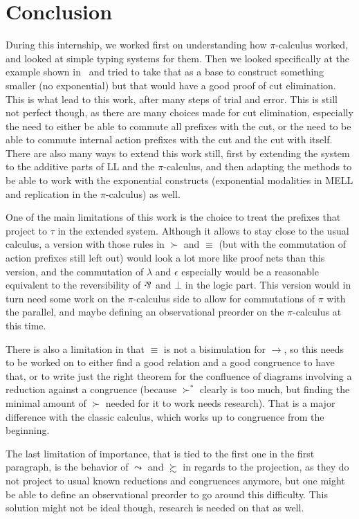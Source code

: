 \section*{Conclusion}

During this internship, we worked first on understanding how $\pi$-calculus worked, and looked at simple typing systems for them. Then we looked specifically at the example shown in~\cite{beffara-2015-unifying} and tried to take that as a base to construct something smaller (no exponential) but that would have a good proof of cut elimination. This is what lead to this work, after many steps of trial and error. This is still not perfect though, as there are many choices made for cut elimination, especially the need to either be able to commute all prefixes with the cut, or the need to be able to commute internal action prefixes with the cut and the cut with itself. There are also many ways to extend this work still, first by extending the system to the additive parts of LL and the $\pi$-calculus, and then adapting the methods to be able to work with the exponential constructs (exponential modalities in MELL and replication in the $\pi$-calculus) as well.

One of the main limitations of this work is the choice to treat the prefixes that project to $\tau$ in the extended system. Although it allows to stay close to the usual calculus, a version with those rules in $\succ$ and $\equiv$ (but with the commutation of action prefixes still left out) would look a lot more like proof nets than this version, and the commutation of $\lambda$ and $\epsilon$ especially would be a reasonable equivalent to the reversibility of $\logpar$ and $\bot$ in the logic part. This version would in turn need some work on the $\pi$-calculus side to allow for commutations of $\pi$ with the parallel, and maybe defining an observational preorder on the $\pi$-calculus at this time.

There is also a limitation in that $\equiv$ is not a bisimulation for $\to$, so this needs to be worked on to either find a good relation and a good congruence to have that, or to write just the right theorem for the confluence of diagrams involving a reduction against a congruence (because $\succ^*$ clearly is too much, but finding the minimal amount of $\succ$ needed for it to work needs research). That is a major difference with the classic calculus, which works up to congruence from the beginning.

The last limitation of importance, that is tied to the first one in the first paragraph, is the behavior of $\leadsto$ and $\succsim$ in regards to the projection, as they do not project to usual known reductions and congruences anymore, but one might be able to define an observational preorder to go around this difficulty. This solution might not be ideal though, research is needed on that as well.

